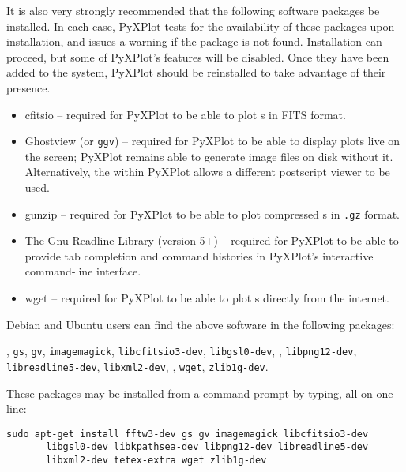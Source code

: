 \noindent It is also very strongly recommended that the following software
packages be installed. In each case, PyXPlot tests for the availability of
these packages upon installation, and issues a warning if the package is not
found. Installation can proceed, but some of PyXPlot's features will be
disabled. Once they have been added to the system, PyXPlot should be
reinstalled to take advantage of their presence.

\vspace{0.5cm}
\begin{itemize}
\item cfitsio -- required for PyXPlot to be able to plot \datafile s in FITS format.
\item Ghostview  (or {\tt ggv}) -- required for PyXPlot to be able to display plots live on the screen; PyXPlot remains able to generate image files on disk without it. Alternatively, the  within PyXPlot allows a different postscript viewer to be used.
\item gunzip  -- required for PyXPlot to be able to plot compressed \datafile s in {\tt .gz} format.
\item The Gnu Readline Library (version 5+)  -- required for PyXPlot to be able to provide tab completion and command histories in PyXPlot's interactive command-line interface.
\item wget  -- required for PyXPlot to be able to plot \datafile s directly from the internet.
\end{itemize}
\vspace{0.5cm}

Debian and Ubuntu users can find the above software in the following packages:

\vspace{2mm}
, {\tt gs}, {\tt gv}, {\tt imagemagick}, {\tt libcfitsio3-dev}, {\tt libgsl0-dev},\newline
{}, {\tt libpng12-dev}, {\tt libreadline5-dev}, {\tt libxml2-dev},\newline
{}, {\tt wget}, {\tt zlib1g-dev}.
\vspace{2mm}

\noindent These packages may be installed from a command prompt by typing, all on one line:

\begin{verbatim}
sudo apt-get install fftw3-dev gs gv imagemagick libcfitsio3-dev
       libgsl0-dev libkpathsea-dev libpng12-dev libreadline5-dev
       libxml2-dev tetex-extra wget zlib1g-dev
\end{verbatim}

